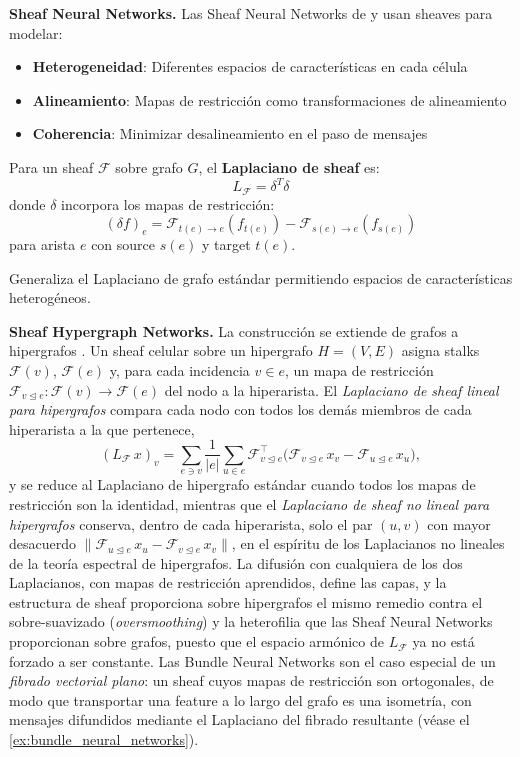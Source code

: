 \textbf{Sheaf Neural Networks.}\label{rem:sheaf_nns} Las Sheaf Neural Networks de \citet{hansen2021sheaf} y \citet{bodnar2023cellular} usan sheaves para modelar:
\begin{itemize}
    \item \textbf{Heterogeneidad}: Diferentes espacios de características en cada célula
    \item \textbf{Alineamiento}: Mapas de restricción como transformaciones de alineamiento
    \item \textbf{Coherencia}: Minimizar desalineamiento en el paso de mensajes
\end{itemize}

\begin{example}\label{ex:sheaf_laplacian}
Para un sheaf $\mathcal{F}$ sobre grafo $G$, el \textbf{Laplaciano de sheaf} es:
\[L_{\mathcal{F}} = \delta^T \delta\]
donde $\delta$ incorpora los mapas de restricción:
\[(\delta f)_e = \mathcal{F}_{t(e) \to e}(f_{t(e)}) - \mathcal{F}_{s(e) \to e}(f_{s(e)})\]
para arista $e$ con source $s(e)$ y target $t(e)$.

Generaliza el Laplaciano de grafo estándar permitiendo espacios de características heterogéneos.
\end{example}

\textbf{Sheaf Hypergraph Networks.} La construcción se extiende de grafos a hipergrafos \citep{duta2023sheafhypergraph}. Un sheaf celular sobre un hipergrafo $H = (V, E)$ asigna stalks $\mathcal{F}(v)$, $\mathcal{F}(e)$ y, para cada incidencia $v \in e$, un mapa de restricción $\mathcal{F}_{v \trianglelefteq e}: \mathcal{F}(v) \to \mathcal{F}(e)$ del nodo a la hiperarista. El \emph{Laplaciano de sheaf lineal para hipergrafos} compara cada nodo con todos los demás miembros de cada hiperarista a la que pertenece,
\[(L_{\mathcal{F}}\, x)_v = \sum_{e \ni v} \frac{1}{|e|} \sum_{u \in e} \mathcal{F}_{v \trianglelefteq e}^{\top}\big(\mathcal{F}_{v \trianglelefteq e}\, x_v - \mathcal{F}_{u \trianglelefteq e}\, x_u\big),\]
y se reduce al Laplaciano de hipergrafo estándar cuando todos los mapas de restricción son la identidad, mientras que el \emph{Laplaciano de sheaf no lineal para hipergrafos} conserva, dentro de cada hiperarista, solo el par $(u, v)$ con mayor desacuerdo $\|\mathcal{F}_{u \trianglelefteq e}\, x_u - \mathcal{F}_{v \trianglelefteq e}\, x_v\|$, en el espíritu de los Laplacianos no lineales de la teoría espectral de hipergrafos. La difusión con cualquiera de los dos Laplacianos, con mapas de restricción aprendidos, define las capas, y la estructura de sheaf proporciona sobre hipergrafos el mismo remedio contra el sobre-suavizado (\textit{oversmoothing}) y la heterofilia que las Sheaf Neural Networks proporcionan sobre grafos, puesto que el espacio armónico de $L_{\mathcal{F}}$ ya no está forzado a ser constante. Las Bundle Neural Networks \citep{bamberger2024bundlenn} son el caso especial de un \emph{fibrado vectorial plano}: un sheaf cuyos mapas de restricción son ortogonales, de modo que transportar una feature a lo largo del grafo es una isometría, con mensajes difundidos mediante el Laplaciano del fibrado resultante (véase el \autoref{ex:bundle_neural_networks}).

